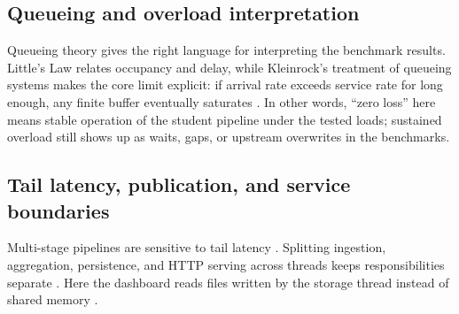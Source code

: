 \documentclass[11pt]{article}
\begin{document}
\subsection*{Queueing and overload interpretation}
Queueing theory gives the right language for interpreting the benchmark results. Little's Law relates occupancy and delay, while Kleinrock's treatment of queueing systems makes the core limit explicit: if arrival rate exceeds service rate for long enough, any finite buffer eventually saturates \cite{little1961,kleinrock1975}. In other words, ``zero loss'' here means stable operation of the student pipeline under the tested loads; sustained overload still shows up as waits, gaps, or upstream overwrites in the benchmarks.

\subsection*{Tail latency, publication, and service boundaries}
Multi-stage pipelines are sensitive to tail latency \cite{dean2013}. Splitting ingestion, aggregation, persistence, and HTTP serving across threads keeps responsibilities separate \cite{goetz2006,ousterhout2018,fielding2022}. Here the dashboard reads files written by the storage thread instead of shared memory \cite{kleppmann2017,sutter2005,tokio2026}.
\end{document}
